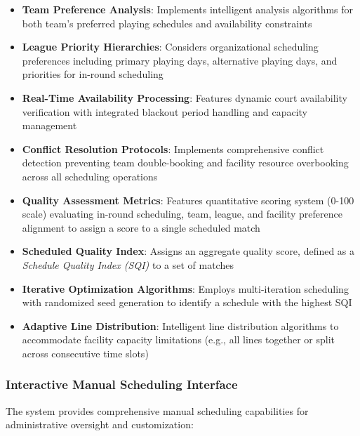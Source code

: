\begin{itemize}

    \item \textbf{Team Preference Analysis}: Implements intelligent analysis algorithms for both team's preferred playing schedules and availability constraints
    \item \textbf{League Priority Hierarchies}: Considers organizational scheduling preferences including primary playing days, alternative playing days, and priorities for in-round scheduling
    \item \textbf{Real-Time Availability Processing}: Features dynamic court availability verification with integrated blackout period handling and capacity management
    \item \textbf{Conflict Resolution Protocols}: Implements comprehensive conflict detection preventing team double-booking and facility resource overbooking across all scheduling operations
    \item \textbf{Quality Assessment Metrics}: Features quantitative scoring system (0-100 scale) evaluating in-round scheduling, team, league, and facility preference alignment to assign a score to a single scheduled match
    \item \textbf{Scheduled Quality Index}: Assigns an aggregate quality score, defined as a \emph{Schedule Quality Index (SQI)} to a set of matches
    \item \textbf{Iterative Optimization Algorithms}: Employs multi-iteration scheduling with randomized seed generation to identify a schedule with the highest SQI
    \item \textbf{Adaptive Line Distribution}: Intelligent line distribution algorithms to accommodate facility capacity limitations (e.g., all lines together or split across consecutive time slots)
\end{itemize}

\subsubsection{Interactive Manual Scheduling Interface}
The system provides comprehensive manual scheduling capabilities for administrative oversight and customization:

